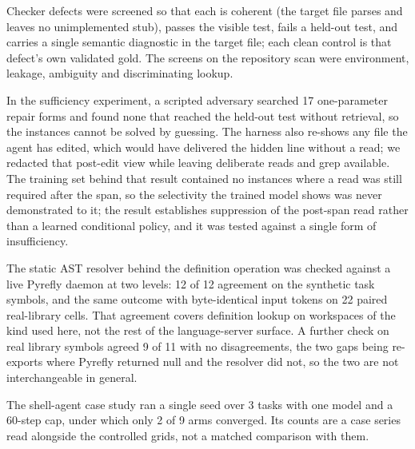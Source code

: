 \documentclass[
]{article}
\newcounter{none} %
\begin{document}
Checker defects were screened so that each is coherent (the target file
parses and leaves no unimplemented stub), passes the visible test, fails
a held-out test, and carries a single semantic diagnostic in the target
file; each clean control is that defect's own validated gold. The
screens on the repository scan were environment, leakage, ambiguity and
discriminating lookup.

In the sufficiency experiment, a scripted adversary searched 17
one-parameter repair forms and found none that reached the held-out test
without retrieval, so the instances cannot be solved by guessing. The
harness also re-shows any file the agent has edited, which would have
delivered the hidden line without a read; we redacted that post-edit
view while leaving deliberate reads and grep available. The training set
behind that result contained no instances where a read was still
required after the span, so the selectivity the trained model shows was
never demonstrated to it; the result establishes suppression of the
post-span read rather than a learned conditional policy, and it was
tested against a single form of insufficiency.

The static AST resolver behind the definition operation was checked
against a live Pyrefly daemon at two levels: 12 of 12 agreement on the
synthetic task symbols, and the same outcome with byte-identical input
tokens on 22 paired real-library cells. That agreement covers definition
lookup on workspaces of the kind used here, not the rest of the
language-server surface. A further check on real library symbols agreed
9 of 11 with no disagreements, the two gaps being re-exports where
Pyrefly returned null and the resolver did not, so the two are not
interchangeable in general.

The shell-agent case study ran a single seed over 3 tasks with one model
and a 60-step cap, under which only 2 of 9 arms converged. Its counts
are a case series read alongside the controlled grids, not a matched
comparison with them.



\end{document}
